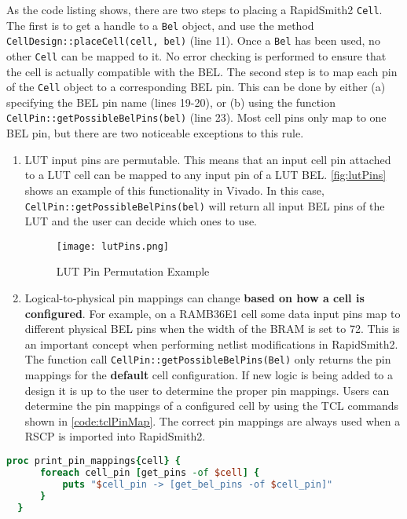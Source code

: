 As the code listing shows, there are two steps to placing a RapidSmith2
\texttt{Cell}. The first is to get a handle to a \texttt{Bel}
object, and use the method \texttt{CellDesign::placeCell(cell, bel)} (line
11). Once a \texttt{Bel} has been used, no other \texttt{Cell} can be mapped to
it. No error checking is performed to ensure that the cell is actually
compatible with the BEL. The second step is to map each pin of the \texttt{Cell}
object to a corresponding BEL pin. This can be done by either (a)
specifying the BEL pin name (lines 19-20), or (b) using the function
\texttt{CellPin::getPossibleBelPins(bel)} (line 23). Most cell pins only map to
one BEL pin, but there are two noticeable exceptions to this rule.

\begin {enumerate}
  \item LUT input pins are permutable. This means that an input cell pin
  attached to a LUT cell can be mapped to any input pin of a LUT BEL.
  \autoref{fig:lutPins} shows an example of this functionality in Vivado. In
  this case,  \texttt{CellPin::get\-PossibleBelPins(bel)} will return
  all input BEL pins of the LUT and the user can decide which ones to
  use.
  
  \begin{figure}[t!]
	\centering
	\texttt{[image: lutPins.png]}
	\caption{LUT Pin Permutation Example}
	\label{fig:lutPins}
  \end{figure}
  
  \item Logical-to-physical pin mappings can change \textbf{based on how a cell
  is configured}. For example, on a RAMB36E1 cell some data input pins map to
  different physical BEL pins when the width of the BRAM is set to 72. This is
  an important concept when performing netlist modifications in RapidSmith2. The
  function call \texttt{CellPin::get\-PossibleBelPins(Bel)} only returns the pin
  mappings for the \textbf{default} cell configuration. If new logic is being
  added to a design it is up to the user to determine the proper pin mappings. 
  Users can determine the pin mappings of a configured cell by using the TCL
  commands shown in \autoref{code:tclPinMap}. The correct pin mappings are
  always used when a RSCP is imported into RapidSmith2.

\end{enumerate}

\newpage
\begin{lstlisting}[xleftmargin=1.5em, framexleftmargin=1.5em, language=tcl,
caption=TCL script to print all logical-to-physical pin mappings of a
cell,label=code:tclPinMap] 
  proc print_pin_mappings{cell} {
	  foreach cell_pin [get_pins -of $cell] {
		  puts "$cell_pin -> [get_bel_pins -of $cell_pin]" 
	  }
  }
\end{lstlisting}
 
